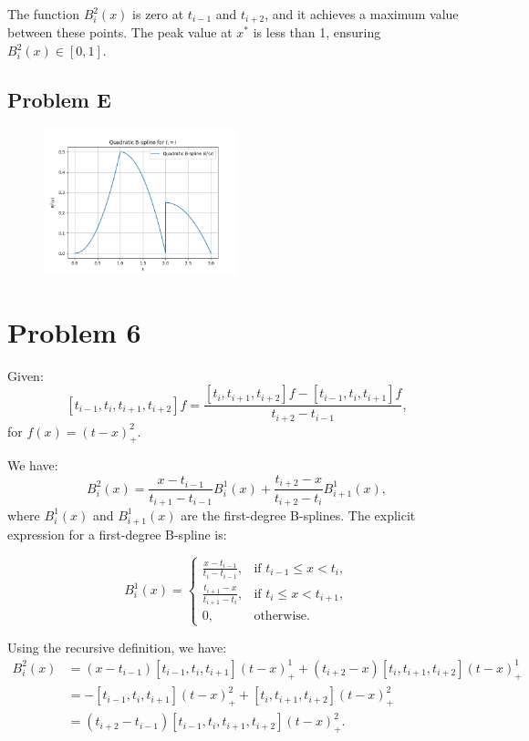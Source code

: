 \documentclass{article}
\begin{document}
The function \( B_i^2(x) \) is zero at \( t_{i-1} \) and \( t_{i+2} \), and it achieves a maximum value between these points. The peak value at \( x^* \) is less than 1, ensuring \( B_i^2(x) \in [0, 1] \).

\subsection{Problem E}
\begin{figure}[h] %
    \centering
    \includegraphics[width=0.5\textwidth]{Figure_1.png} 
    \label{fig:sample_image} %
\end{figure}




\section{Problem 6}
Given:
\[
[t_{i-1}, t_i, t_{i+1}, t_{i+2}]f = \frac{[t_i, t_{i+1}, t_{i+2}]f - [t_{i-1}, t_i, t_{i+1}]f}{t_{i+2} - t_{i-1}},
\]
for \( f(x) = (t - x)^2_+ \).

We have:
\[
B_i^2(x) = \frac{x - t_{i-1}}{t_{i+1} - t_{i-1}} B_i^1(x) + \frac{t_{i+2} - x}{t_{i+2} - t_i} B_{i+1}^1(x),
\]
where \( B_i^1(x) \) and \( B_{i+1}^1(x) \) are the first-degree B-splines. The explicit expression for a first-degree B-spline is:

\[
B_i^1(x) = \begin{cases} 
\frac{x - t_{i-1}}{t_i - t_{i-1}}, & \text{if } t_{i-1} \leq x < t_i, \\[10pt]
\frac{t_{i+1} - x}{t_{i+1} - t_i}, & \text{if } t_i \leq x < t_{i+1}, \\[10pt]
0, & \text{otherwise}.
\end{cases}
\]

Using the recursive definition, we have:
\begin{align*}
B_i^2(x) &= (x - t_{i-1})[t_{i-1}, t_i, t_{i+1}] (t - x)_+^1 + (t_{i+2} - x)[t_i, t_{i+1}, t_{i+2}] (t - x)_+^1 \\
&= -[t_{i-1}, t_i, t_{i+1}] (t - x)_+^2 + [t_i, t_{i+1}, t_{i+2}] (t - x)_+^2 \\
&= (t_{i+2} - t_{i-1}) [t_{i-1}, t_i, t_{i+1}, t_{i+2}] (t - x)_+^2.
\end{align*}
\end{document}
